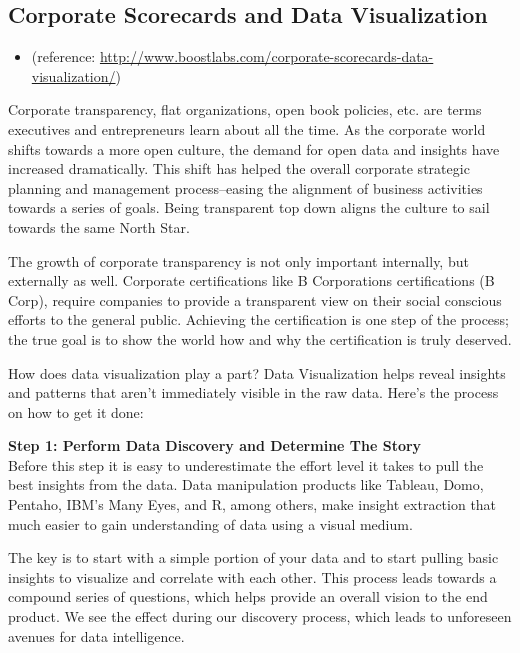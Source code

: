 \documentclass[]{book}
\providecommand{\tightlist}{%
  \setlength{\itemsep}{0pt}\setlength{\parskip}{0pt}}
\theoremstyle{definition}
\theoremstyle{definition}
\theoremstyle{definition}
\theoremstyle{remark}
\begin{document}
\subsection{Corporate Scorecards and Data
Visualization}\label{corporate-scorecards-and-data-visualization}

\begin{itemize}
\tightlist
\item
  (reference:
  \url{http://www.boostlabs.com/corporate-scorecards-data-visualization/})
\end{itemize}

Corporate transparency, flat organizations, open book policies, etc. are
terms executives and entrepreneurs learn about all the time. As the
corporate world shifts towards a more open culture, the demand for open
data and insights have increased dramatically. This shift has helped the
overall corporate strategic planning and management process--easing the
alignment of business activities towards a series of goals. Being
transparent top down aligns the culture to sail towards the same North
Star.

The growth of corporate transparency is not only important internally,
but externally as well. Corporate certifications like B Corporations
certifications (B Corp), require companies to provide a transparent view
on their social conscious efforts to the general public. Achieving the
certification is one step of the process; the true goal is to show the
world how and why the certification is truly deserved.

How does data visualization play a part? Data Visualization helps reveal
insights and patterns that aren't immediately visible in the raw data.
Here's the process on how to get it done:

\textbf{Step 1: Perform Data Discovery and Determine The Story}\\
Before this step it is easy to underestimate the effort level it takes
to pull the best insights from the data. Data manipulation products like
Tableau, Domo, Pentaho, IBM's Many Eyes, and R, among others, make
insight extraction that much easier to gain understanding of data using
a visual medium.

The key is to start with a simple portion of your data and to start
pulling basic insights to visualize and correlate with each other. This
process leads towards a compound series of questions, which helps
provide an overall vision to the end product. We see the effect during
our discovery process, which leads to unforeseen avenues for data
intelligence.
\end{document}
